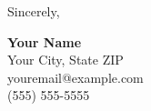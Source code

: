 \documentclass[10pt]{letter}
\begin{document}
\begin{letter}{}
\vspace{0.6em}

\closing{\textcolor{bannerblue}{Sincerely,}}

\vspace{0.1em}

{\color{bannerblue}\textbf{Your Name} \\ Your City, State ZIP \\ youremail@example.com \\ (555) 555-5555}

\end{letter}
\end{document}
